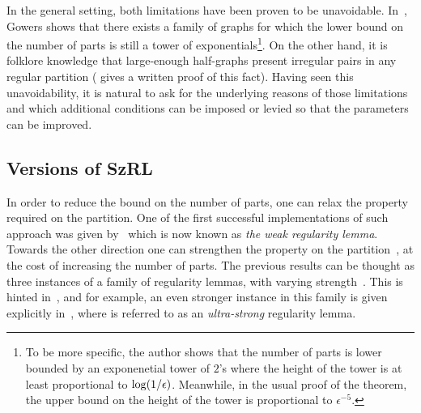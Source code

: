    In the general setting, both limitations have been proven to be unavoidable.
    In~\cite{lower_bounds_of_tower_type_for_szeremedis_uniformity_lemma}, Gowers shows that there exists a family of graphs
    for which the lower bound on the number of parts is still a tower of exponentials\footnote{
    To be more specific, the author shows that the number of parts is lower bounded by an exponenetial tower of $2$'s where
        the height of the tower is at least proportional to $\log( 1/\epsilon )$.
        Meanwhile, in the usual proof of the theorem, the upper bound on the height of the tower is proportional to
        $\epsilon^{-5}$.
    }.
    On the other hand, it is folklore knowledge that large-enough half-graphs present irregular pairs in any
    regular partition (\cite{irregular_pairs_in_half_graphs_szemeredi_regularity} gives a written proof of this fact).
    Having seen this unavoidability, it is natural to ask for the underlying reasons of those limitations and which
    additional conditions can be imposed or levied so that the parameters can be improved.

    \subsection{Versions of SzRL}
    In order to reduce the bound on the number of parts, one can relax the property required on the partition.
    One of the first successful implementations of such approach was given
    by~\cite[Theorem 12]{quick_approximation_to_matrices_and_applications} which is now known as
    \emph{the weak regularity lemma}.
    Towards the other direction one can strengthen the property on the
    partition~\cite[Lemma 4.1]{efficient_testing_of_large_graphs}, at the cost of increasing the number of parts.
    The previous results can be thought as three instances of a family of regularity lemmas, with varying
    strength~\cite{regularity_partitions_and_the_topology_of_graphons, szemeredis_lemma_for_the_analyst}.
    This is hinted in~\cite[Lemma 4.1 and its discussion]{szemeredis_lemma_for_the_analyst}, and for example, an even
    stronger instance in this family is given explicitly in~\cite[Section 5.1 - pg. 439]{regularity_partitions_and_the_topology_of_graphons},
    where is referred to as an \emph{ultra-strong} regularity lemma.

